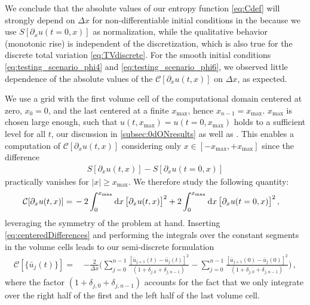 We conclude that the absolute values of our entropy function \eqref{eq:Cdef} will strongly depend on $\Delta x$ for non-differentiable initial conditions in the \ir{} because we use $S [ \partial_x u ( t = 0, x ) ]$ as normalization, while the qualitative behavior (monotonic rise) is independent of the discretization, which is also true for the discrete total variation \eqref{eq:TVdiscrete}. 
For the smooth initial conditions \eqref{eq:testing_scenario_phi4} and \eqref{eq:testing_scenario_phi6}, we observed little dependence of the absolute values of the $\mathcal{C}[\partial_x u ( t, x )]$ on $\Delta x$, as expected.

We use a grid with the first volume cell of the computational domain centered at zero, $x_0 = 0$, and the last centered at a finite $x_\mathrm{max}$, hence $x_{n - 1} = x_\mathrm{max}$. $x_\mathrm{max}$ is chosen large enough, such that $u ( t, x_\mathrm{max} ) = u ( t = 0, x_\mathrm{max} )$ holds to a sufficient level for all $t$, \cf{} our discussion in \cref{subsec:0dONresults} as well as .
This enables a computation of $\mathcal{C} [ \partial_x u ( t, x ) ]$ considering only $x \in [ - x_\mathrm{max}, + x_\mathrm{max} ]$ since the difference 
\begin{align}
S [ \partial_x u ( t, x ) ] - S [ \partial_x u ( t = 0, x ) ]
\end{align}
practically vanishes for $|x|\geq x_\mathrm{max}$.
We therefore study the following quantity:
\begin{align}
	\mathcal{C} [ \partial_x u ( t, x ) ] = \, & - 2 \int_{0}^{x_\mathrm{max}} \dif x \, \big[ \partial_x u ( t, x ) \big]^2 + 2 \int_{0}^{x_\mathrm{max}} \dif x \, \big[ \partial_x u ( t = 0, x ) \big]^2\,,	
\end{align}
leveraging the \ZII{} symmetry of the problem at hand.
Inserting \cref{eq:centeredDifferences} and performing the integrals over the constant segments in the volume cells leads to our semi-discrete formulation
\begin{align}
	\mathcal{C} [ \{\bar{u}_j(t)\} ] = \, & - \frac{2}{\Delta x} \Bigg( \sum_{j = 0}^{n-1} \frac{[ \bar{u}_{j + 1} ( t ) - \bar{u}_{j} ( t ) ]^2}{( 1 + \delta_{j,0} + \delta_{j,n-1} ) } - \sum_{j = 0}^{n-1} \frac{ [ \bar{u}_{j + 1} ( 0 ) - \bar{u}_{j} ( 0 ) ]^2}{( 1 + \delta_{j,0} + \delta_{j,n-1} )} \Bigg) \, ,	\label{eq:Cdiscrete}
\end{align}
where the factor $(1+\delta_{j,0}+\delta_{j,n-1})$ accounts for the fact that we only integrate over the right half of the first and the left half of the last volume cell. 

